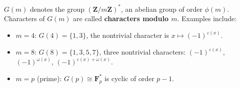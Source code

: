 $G(m)$ denotes the group $(\mathbf{Z}/m\mathbf{Z})^*$, an abelian group of order $\phi(m)$. Characters of $G(m)$ are called \textbf{characters modulo $m$}. Examples include:
\begin{itemize}
\item $m=4$: $G(4) = \{1,3\}$, the nontrivial character is $x \mapsto (-1)^{\varepsilon(x)}$.
\item $m=8$: $G(8) = \{1,3,5,7\}$, three nontrivial characters: $(-1)^{\varepsilon(x)}$, $(-1)^{\omega(x)}$, $(-1)^{\varepsilon(x)+\omega(x)}$.
\item $m=p$ (prime): $G(p) \cong \mathbf{F}_p^*$ is cyclic of order $p-1$.
\end{itemize}
